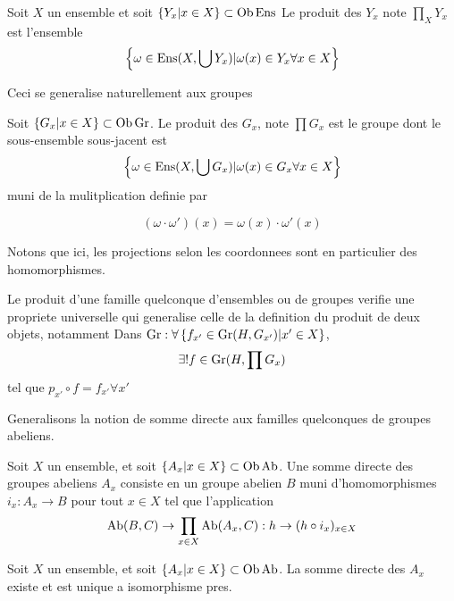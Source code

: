 \documentclass[../main.tex]{subfiles}
\begin{document}
\begin{defn}
	Soit $X$ un ensemble et soit $ \left\{ Y_x |x\in X \right\} \subset \operatorname{Ob} \operatorname{Ens} $ Le produit des $Y_x$ note $\prod_X Y_x$ est l'ensemble
	\[ 
	\left\{ \omega \in \operatorname{Ens}( X, \bigcup Y_x) | \omega( x) \in Y_x\forall x \in X \right\} 
	\]
	
\end{defn}
Ceci se generalise naturellement aux groupes
\begin{defn}
	Soit $\left\{ G_x| x \in X \right\} \subset \operatorname{Ob} \operatorname{Gr}$. Le produit des $G_x$, note $\prod G_x$ est le groupe dont le sous-ensemble sous-jacent est
	\[ 
	\left\{ \omega\in \operatorname{Ens}( X, \bigcup G_x) | \omega( x) \in G_x\forall x \in X \right\} 
	\]
	muni de la mulitplication definie par

	\[ 
( \omega\cdot \omega' )	( x) = \omega( x) \cdot \omega'( x) 
	\]
\end{defn}
Notons que ici, les projections selon les coordonnees sont en particulier des homomorphismes.
\begin{rmq}
Le produit d'une famille quelconque d'ensembles ou de groupes verifie une propriete universelle qui generalise celle de la definition du produit de deux objets, notamment
Dans $\operatorname{Gr}: \forall \left\{ f_{x'} \in \operatorname{Gr}( H, G_{x'} ) | x'\in X \right\} $, 
\begin{align*}
\exists ! f \in \operatorname{Gr}( H, \prod G_x ) 
\end{align*}
tel que $p_{x'} \circ f  = f_{x'} \forall x'$ 

\end{rmq}
Generalisons la notion de somme directe aux familles quelconques de groupes abeliens.
\begin{defn}
	Soit $X$ un ensemble, et soit $ \left\{ A_x|x\in X \right\} \subset \operatorname{Ob}\operatorname{Ab}$. Une somme directe des groupes abeliens $A_x$ consiste en un groupe abelien $B$ muni d'homomorphismes $i_x: A_x\to B$ pour tout $x\in X$ tel que l'application
	\[ 
\operatorname{Ab}( B,C) \to \prod_{x\in X} \operatorname{Ab}( A_x, C) : h \to ( h\circ i_x)_{x\in X} 	
	\]
	
\end{defn}
\begin{propo}
Soit $X$ un ensemble, et soit $\left\{ A_x| x \in X \right\} \subset \operatorname{Ob} \operatorname{Ab}$. La somme directe des $A_x$ existe et est unique a isomorphisme pres.\\
\end{propo}
\end{document}

